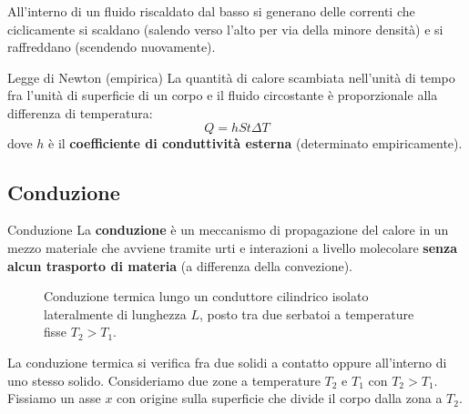 All'interno di un fluido riscaldato dal basso si generano delle correnti che ciclicamente si scaldano (salendo verso l'alto per via della minore densità) e si raffreddano (scendendo nuovamente).

\begin{teorema}{Legge di Newton (empirica)}
La quantità di calore scambiata nell'unità di tempo fra l'unità di superficie di un corpo e il fluido circostante è proporzionale alla differenza di temperatura:
\begin{equation}
\boxed{Q = h S t \Delta T}
\end{equation}
dove $h$ è il \textbf{coefficiente di conduttività esterna} (determinato empiricamente).
\end{teorema}

\subsection{Conduzione}
\begin{definizione}{Conduzione}
La \textbf{conduzione} è un meccanismo di propagazione del calore in un mezzo materiale che avviene tramite urti e interazioni a livello molecolare \textbf{senza alcun trasporto di materia} (a differenza della convezione).
\end{definizione}

\begin{figure}[ht]
\centering
{}
\caption{Conduzione termica lungo un conduttore cilindrico isolato lateralmente di lunghezza $L$, posto tra due serbatoi a temperature fisse $T_2 > T_1$.}
\end{figure}

La conduzione termica si verifica fra due solidi a contatto oppure all'interno di uno stesso solido.
Consideriamo due zone a temperature $T_2$ e $T_1$ con $T_2 > T_1$. Fissiamo un asse $x$ con origine sulla superficie che divide il corpo dalla zona a $T_2$.

